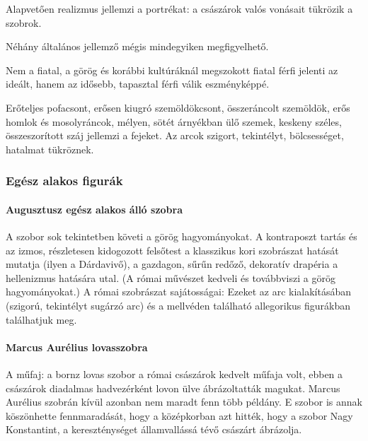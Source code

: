 	Alapvetően realizmus jellemzi a portrékat: a császárok valós vonásait tükrözik a szobrok.
	
	Néhány általános jellemző mégis mindegyiken megfigyelhető.
	
	Nem a fiatal, a görög és korábbi kultúráknál megszokott fiatal férfi jelenti az ideált, hanem az idősebb, tapasztal férfi válik eszményképpé.
	
	Erőteljes pofacsont, erősen kiugró szemöldökcsont, összeráncolt szemöldök, erős homlok és mosolyráncok, mélyen, sötét árnyékban ülő szemek, keskeny széles, összeszorított száj jellemzi a fejeket. Az arcok szigort, tekintélyt, bölcsességet, hatalmat tükröznek.

\subsubsection{Egész alakos figurák}

	\paragraph{Augusztusz egész alakos álló szobra}
	A szobor sok tekintetben követi a görög hagyományokat.
	A kontraposzt tartás és az izmos, részletesen kidogozott felsőtest a klasszikus kori szobrászat hatását mutatja (ilyen a Dárdavivő), a gazdagon, sűrűn redőző, dekoratív drapéria a hellenizmus hatására utal. (A római művészet kedveli és továbbviszi a görög hagyományokat.) A római szobrászat sajátosságai:
	Ezeket az arc kialakításában (szigorú, tekintélyt sugárzó arc) és a mellvéden található allegorikus figurákban találhatjuk meg.
	
	
	\paragraph{Marcus Aurélius lovasszobra}
	A műfaj: a bornz lovas szobor a római császárok kedvelt műfaja volt, ebben a császárok diadalmas hadvezérként lovon ülve ábrázoltatták magukat. Marcus Aurélius szobrán kívül azonban nem maradt fenn több példány. E szobor is annak köszönhette fennmaradását, hogy a középkorban azt hitték, hogy a szobor Nagy Konstantint, a kereszténységet államvallássá tévő császárt ábrázolja.
	
	\begin{figure}[H]
		\begin{minipage}{0.45\textwidth}
		\end{minipage}
		\hfill
		\begin{minipage}{0.45\textwidth}
		\end{minipage}	
	\end{figure}

